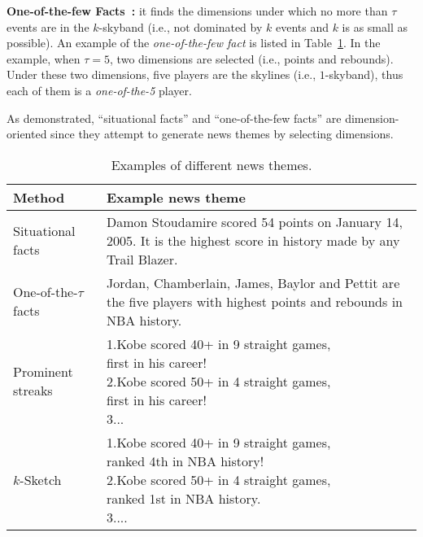 \noindent\textbf{One-of-the-few Facts~\cite{wu2012one}:}  it finds the dimensions
under which no more than $\tau$ events are in the $k$-skyband (i.e., not dominated by $k$ events and $k$ is as small as possible).
An example of the \emph{one-of-the-few fact} is listed
in Table~\ref{tbl:sketh:related_works}. In the example, when $\tau=5$, two dimensions are selected (i.e., points and rebounds). Under these two dimensions, five players are the skylines (i.e., $1$-skyband), thus each of them is a \emph{one-of-the-5} player.

As demonstrated, ``situational facts''
and ``one-of-the-few facts'' are dimension-oriented since they attempt to generate news themes by selecting dimensions.


\begin{table}[h]
\centering
\caption{Examples of different news themes.}
\label{tbl:sketh:related_works}
\begin{tabular}{|l|p{10cm}|}
\hline 
\textbf{Method} & \textbf{Example news theme}\\
\hline
Situational facts~\cite{sultana2014incremental} & Damon Stoudamire scored 54
points on January 14, 2005. It is the highest score in history made
by any Trail Blazer. \\
\hline
One-of-the-$\tau$ facts~\cite{wu2012one} & Jordan, Chamberlain, James, Baylor and Pettit are the five players with highest points and rebounds in NBA history. \\
\hline
Prominent streaks~\cite{zhang2014discovering} & \makecell[l]{ 1.Kobe scored 40+ in 9 straight games,\\ first in his career! \\  2.Kobe scored 50+ in 4 straight games, \\first in his career!\\  3...} \\
\hline
$k$-Sketch & \makecell[l]{1.Kobe scored 40+ in 9 straight games, \\ ranked 4th in NBA history! \\  2.Kobe scored 50+ in 4 straight games, \\ ranked 1st in NBA history.  \\ 3....} \\
\hline
\end{tabular}
\end{table}

